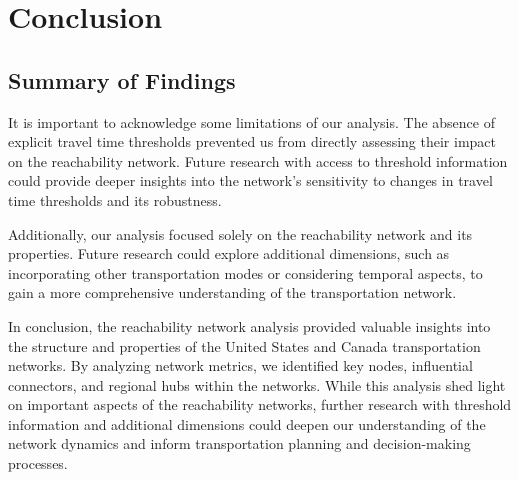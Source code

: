 \section{Conclusion}

\subsection{Summary of Findings}


It is important to acknowledge some limitations of our analysis. The absence of explicit travel time thresholds prevented us from directly assessing their impact on the reachability network. Future research with access to threshold information could provide deeper insights into the network's sensitivity to changes in travel time thresholds and its robustness.

Additionally, our analysis focused solely on the reachability network and its properties. Future research could explore additional dimensions, such as incorporating other transportation modes or considering temporal aspects, to gain a more comprehensive understanding of the transportation network.

In conclusion, the reachability network analysis provided valuable insights into the structure and properties of the United States and Canada transportation networks. By analyzing network metrics, we identified key nodes, influential connectors, and regional hubs within the networks. While this analysis shed light on important aspects of the reachability networks, further research with threshold information and additional dimensions could deepen our understanding of the network dynamics and inform transportation planning and decision-making processes.